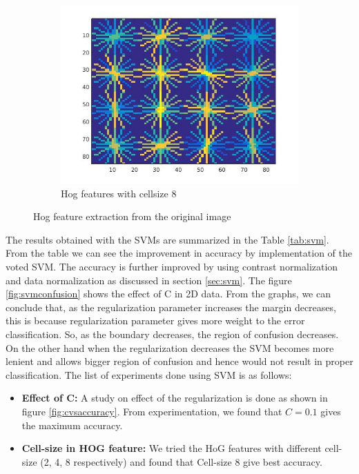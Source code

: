 \documentclass{article} %
\begin{document}
\begin{figure}
\begin{subfigure}{0.33\textwidth}
\includegraphics[scale=0.25]{images/hog_cellsize_8}
\caption{Hog features with cellsize 8}
\end{subfigure}
\caption{Hog feature extraction from the original image}
\label{fig:hog}
\end{figure}


        The results obtained with the SVMs are summarized in the Table \ref{tab:svm}. From the table we can see the improvement in accuracy by implementation of the voted SVM. The accuracy is further improved by using contrast normalization and data normalization as discussed in section \ref{sec:svm}. 
        The figure \ref{fig:svmconfusion} shows the effect of C in 2D data. From the graphs, we can conclude that, as the regularization parameter increases the margin decreases, this is because regularization parameter gives more weight to the error classification. So, as the boundary decreases, the region of confusion decreases. On the other hand when the regularization decreases  the SVM becomes more lenient and allows bigger region of confusion and hence would not result in proper classification.
        The list of experiments done using SVM is as follows:
\begin{itemize}
\item \textbf{Effect of C:} A study on effect of the regularization is done as shown in figure \ref{fig:cvsaccuracy}. From experimentation, we found that $C=0.1$ gives the maximum accuracy.
\item \textbf{Cell-size in HOG feature:} We tried the HoG features with different cell-size (2, 4, 8 respectively) and found that Cell-size 8 give best accuracy.
\end{itemize}
\end{document}
